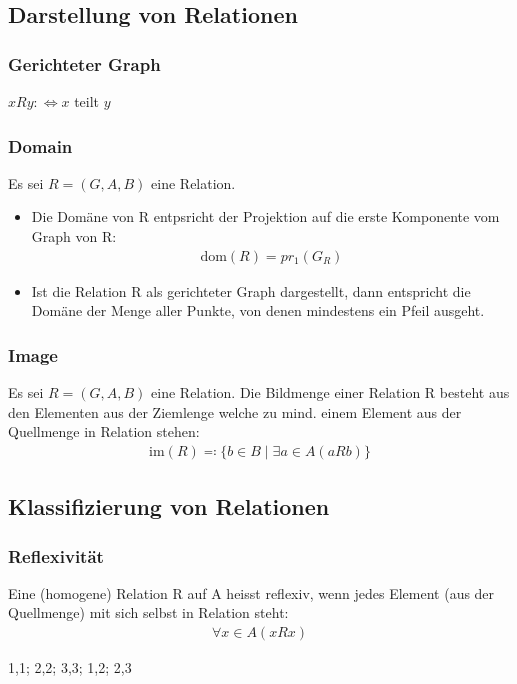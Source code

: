 \subsection{Darstellung von Relationen}
\subsubsection{Gerichteter Graph}
\begin{center}
    \gerichtet{}
\end{center}
$xRy: \Leftrightarrow x$ teilt $y$
\subsubsection{Domain}
Es sei $R = (G,A,B)$ eine Relation.
\begin{itemize}
    \item Die Domäne von R entpsricht der Projektion auf die erste Komponente vom Graph von R:
    \begin{align*}
        \text{dom}(R) = pr_{1}(G_R)
    \end{align*}
    \item Ist die Relation R als gerichteter Graph dargestellt, dann
    entspricht die Domäne der Menge aller Punkte, von denen
    mindestens ein Pfeil ausgeht.
\end{itemize}
\subsubsection{Image}
Es sei $R = (G,A,B)$ eine Relation. Die Bildmenge einer Relation R besteht aus den Elementen aus der Ziemlenge
welche zu  mind. einem Element aus der Quellmenge in Relation stehen:
\begin{align*}
    \text{im}(R) \eqqcolon \{b \in B \mid \exists{a} \in A (aRb)\}
\end{align*}

\subsection{Klassifizierung von Relationen} 
\subsubsection{Reflexivität}
Eine (homogene) Relation R auf A heisst reflexiv, wenn jedes
Element (aus der Quellmenge) mit sich selbst in Relation steht:
\begin{align*}
    \forall{x} \in A(xRx)
\end{align*}
\begin{center}
    {
    1,1;
    2,2;
    3,3;
    1,2;
    2,3
    }
\end{center}
